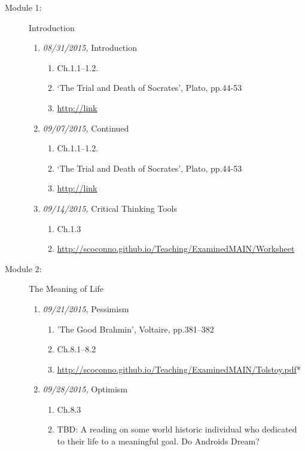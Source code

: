 \documentclass[11pt,article,oneside]{memoir}
\begin{document}
\begin{description}

\item[Module 1:] Introduction

\begin{enumerate}

\item \textit{08/31/2015,} Introduction 
\begin{enumerate}
\item Ch.1.1--1.2.
\item `The Trial and Death of Socrates', Plato, pp.44-53
\item \href{Animation of Plato's Cave}{http://link}
\end{enumerate}


\item \textit{09/07/2015,} Continued

\begin{enumerate}
\item Ch.1.1--1.2.
\item `The Trial and Death of Socrates', Plato, pp.44-53
\item \href{Animation of Plato's Cave}{http://link}
\end{enumerate}

\item \textit{09/14/2015,} Critical Thinking Tools
\begin{enumerate}
\item Ch.1.3
\item \href{Handout}{http://scoconno.github.io/Teaching/ExaminedMAIN/Worksheet}
\end{enumerate}

\end{enumerate}

\item[Module 2:] The Meaning of Life

\begin{enumerate}
\item \textit{09/21/2015,} Pessimism 
\begin{enumerate}
\item 'The Good Brahmin', Voltaire, pp.381--382
\item Ch.8.1--8.2 
\item \href{`A Confession', Leo Tolstoy}{http://scoconno.github.io/Teaching/ExaminedMAIN/Tolstoy.pdf}* 
\end{enumerate}

\item \textit{09/28/2015,} Optimism
\begin{enumerate}
\item Ch.8.3
\item TBD: A reading on some world historic individual who dedicated to their life to a meaningful goal. Do Androids Dream? 
\end{enumerate}


\end{enumerate}
\end{description}
\end{document}
